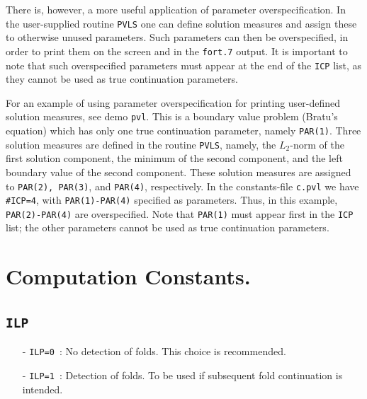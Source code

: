 \documentclass[12pt]{report}
\begin{document}
There is, however, a more useful application of parameter overspecification.
In the user-supplied routine {\tt PVLS} one can define solution measures
and assign these to otherwise unused parameters.
Such parameters can then be overspecified, in order to print them
on the screen and in the {\tt fort.7} output.
It is important to note that such overspecified parameters must appear
at the end of the {\tt ICP} list, as they cannot be used as true continuation
parameters.

For an example of using parameter overspecification for printing user-defined
solution measures, see demo {\tt pvl}.
This is a boundary value problem (Bratu's equation) which has
only one true continuation parameter, namely {\tt PAR(1)}.
Three solution measures are defined in the routine {\tt PVLS}, namely,
the $L_2$-norm of the first solution component,
the minimum of the second component, and
the left boundary value of the second component.
These solution measures are assigned to {\tt PAR(2), PAR(3)}, and {\tt PAR(4)}, respectively.
In the constants-file {\tt c.pvl} we have {\tt \#ICP=4}, with {\tt PAR(1)-PAR(4)}
specified as parameters.
Thus, in this example, {\tt PAR(2)-PAR(4)} are overspecified.
Note that {\tt PAR(1)} must appear first in the {\tt ICP} list;
the other parameters cannot be used as true continuation parameters.
\section{ Computation Constants.} \label{sec:Computation_constants}
\subsection{\tt ILP}  \label{sec:ILP}
\begin{itemize}
\item[-] {\tt ILP=0}~: 
  No detection of folds. This choice is recommended.
\item[-] {\tt ILP=1}~: 
  Detection of folds. To be used if subsequent fold continuation is intended.
\end{itemize}
\end{document}
